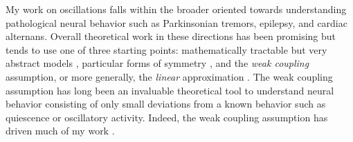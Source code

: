 \documentclass[a4paper,11pt]{article}
\begin{document}
	
	
	My work on oscillations falls within the broader oriented towards understanding pathological neural behavior such as Parkinsonian tremors, epilepsy, and cardiac alternans. Overall theoretical work in these directions has been promising but tends to use one of three starting points: mathematically tractable but very abstract models \cite{ott2008low}, particular forms of symmetry \cite{golubitsky1986hopf}, and the \textit{weak coupling} assumption, or more generally, the \textit{linear} approximation \cite{ermentrout2002modeling}. The weak coupling assumption has long been an invaluable theoretical tool to understand neural behavior consisting of only small deviations from a known behavior such as quiescence or oscillatory activity. Indeed, the weak coupling assumption has driven much of my work \cite{park2016weakly,park2018multiple,park2018scalar}. 
	
\end{document}
